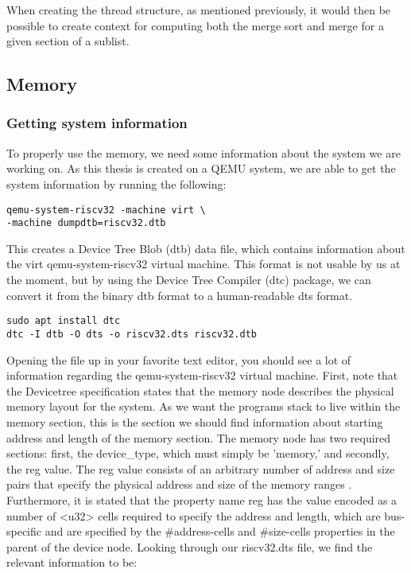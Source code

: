 When creating the thread structure, as mentioned previously, it would then be
possible to create context for computing both the merge sort and merge for a
given section of a sublist.


\subsection{Memory}
\subsubsection*{Getting system information}\label{sec:sys-info}
To properly use the memory, we need some information about the system we are
working on. As this thesis is created on a QEMU system, we are able to get the
system information by running the following:
\begin{lstlisting}
qemu-system-riscv32 -machine virt \
-machine dumpdtb=riscv32.dtb
\end{lstlisting}
 This creates a Device Tree Blob (dtb) data file, which contains information
 about the virt qemu-system-riscv32 virtual machine. This format is not usable
 by us at the moment, but by using the Device Tree Compiler (dtc) package, we
 can convert it from the binary dtb format to a human-readable dts format.
\begin{lstlisting}
sudo apt install dtc
dtc -I dtb -O dts -o riscv32.dts riscv32.dtb
\end{lstlisting}
Opening the file up in your favorite text editor, you should see a lot of
information regarding the qemu-system-riscv32 virtual machine. First, note that
the Devicetree specification states that the memory node describes the physical
memory layout for the system. As we want the programs stack to live within the
memory section, this is the section we should find information about starting
address and length of the memory section. The memory node has two required
sections: first, the device\_type, which must simply be 'memory,' and secondly,
the reg value. The reg value consists of an arbitrary number of address and size
pairs that specify the physical address and size of the memory ranges
\cite{DTS}. Furthermore, it is stated that the property name reg has the value
encoded as a number of <u32> cells required to specify the address and length,
which are bus- specific and are specified by the \#address-cells and
\#size-cells properties in the parent of the device node. Looking through our
riscv32.dts file, we find the relevant information to be:

